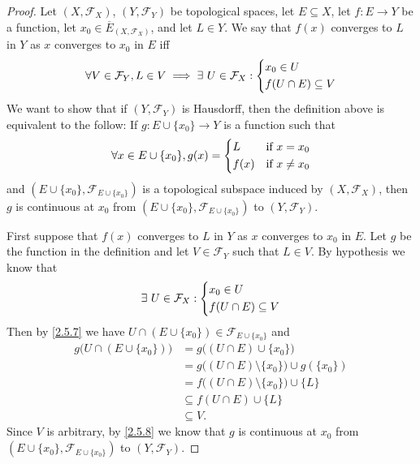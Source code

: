 \begin{proof}
  Let \((X, \mathcal{F}_X)\), \((Y, \mathcal{F}_Y)\) be topological spaces, let \(E \subseteq X\), let \(f : E \to Y\) be a function, let \(x_0 \in \overline{E}_{(X, \mathcal{F}_X)}\), and let \(L \in Y\).
  We say that \(f(x)\) converges to \(L\) in \(Y\) as \(x\) converges to \(x_0\) in \(E\) iff
  \[
    \forall V \in \mathcal{F}_Y, L \in V \implies \exists\ U \in \mathcal{F}_X : \begin{dcases}
      x_0 \in U \\
      f(U \cap E) \subseteq V
    \end{dcases}
  \]
  We want to show that if \((Y, \mathcal{F}_Y)\) is Hausdorff, then the definition above is equivalent to the follow:
  If \(g : E \cup \{x_0\} \to Y\) is a function such that
  \[
    \forall x \in E \cup \{x_0\}, g(x) = \begin{dcases}
      L    & \text{if } x = x_0    \\
      f(x) & \text{if } x \neq x_0
    \end{dcases}
  \]
  and \((E \cup \{x_0\}, \mathcal{F}_{E \cup \{x_0\}})\) is a topological subspace induced by \((X, \mathcal{F}_X)\), then \(g\) is continuous at \(x_0\) from \((E \cup \{x_0\}, \mathcal{F}_{E \cup \{x_0\}})\) to \((Y, \mathcal{F}_Y)\).

  First suppose that \(f(x)\) converges to \(L\) in \(Y\) as \(x\) converges to \(x_0\) in \(E\).
  Let \(g\) be the function in the definition and let \(V \in \mathcal{F}_Y\) such that \(L \in V\).
  By hypothesis we know that
  \[
    \exists\ U \in \mathcal{F}_X : \begin{dcases}
      x_0 \in U \\
      f(U \cap E) \subseteq V
    \end{dcases}
  \]
  Then by \cref{2.5.7} we have \(U \cap (E \cup \{x_0\}) \in \mathcal{F}_{E \cup \{x_0\}}\) and
  \begin{align*}
    g\big(U \cap (E \cup \{x_0\})\big) & = g\big((U \cap E) \cup \{x_0\}\big)                      \\
                                       & = g\big((U \cap E) \setminus \{x_0\}\big) \cup g(\{x_0\}) \\
                                       & = f\big((U \cap E) \setminus \{x_0\}\big) \cup \{L\}      \\
                                       & \subseteq f(U \cap E) \cup \{L\}                          \\
                                       & \subseteq V.
  \end{align*}
  Since \(V\) is arbitrary, by \cref{2.5.8} we know that \(g\) is continuous at \(x_0\) from \((E \cup \{x_0\}, \mathcal{F}_{E \cup \{x_0\}})\) to \((Y, \mathcal{F}_Y)\).


\end{proof}
